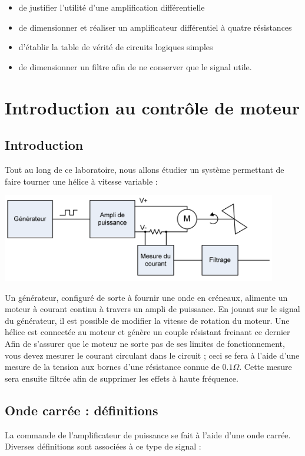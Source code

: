 \documentclass{../template/tp}
\begin{document}
\begin{itemize}
\item de justifier l'utilité d'une amplification différentielle
\item de dimensionner et réaliser un amplificateur différentiel à quatre résistances
\item d'établir la table de vérité de circuits logiques simples
\item de dimensionner un filtre afin de ne conserver que le signal utile.
\end{itemize}

\section{Introduction au contrôle de moteur}
\subsection{Introduction}

Tout au long de ce laboratoire, nous allons étudier un système permettant de faire tourner une hélice à
vitesse variable :

\begin{center}
\includegraphics[width=12cm]{sch1}
\end{center}

Un générateur, configuré de sorte à fournir une onde en créneaux, alimente un moteur à courant
continu à travers un ampli de puissance. En jouant sur le signal du générateur, il est
possible de modifier la vitesse de rotation du moteur.
Une hélice est connectée au moteur et génère un couple résistant freinant ce dernier
Afin de s'assurer que le moteur ne sorte pas de ses limites de fonctionnement, vous devez
mesurer le courant circulant dans le circuit ; ceci se fera à l'aide d'une mesure de la
tension aux bornes d'une résistance connue de $0.1\Omega$. Cette mesure sera ensuite filtrée
afin de supprimer les effets à haute fréquence.

\subsection{Onde carrée : définitions}
La commande de l'amplificateur de puissance se fait à l'aide d'une onde carrée. Diverses
définitions sont associées à ce type de signal :
\end{document}
